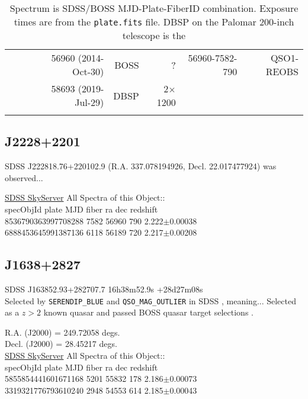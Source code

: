 \documentclass[a4paper,fleqn,usenatbib]{mnras}
\begin{document}
\begin{table*}
\begin{tabular}{r  r  r r    r r r r}
                                         &              &              & 56960   (2014-Oct-30)    & BOSS             & ?                         & 56960-7582-790     & QSO1-REOBS \\ 
                                         &               &             & 58693 (2019-Jul-29)      & DBSP              & 2$\times$1200  &       &    \\
                                       &                &               &                                         &                   &                             &  & \\
   \hline \hline   
  \end{tabular}
  \caption{Spectrum is SDSS/BOSS MJD-Plate-FiberID combination. 
Exposure times are from the {\tt plate.fits} file. 
DBSP on the Palomar 200-inch telescope is the } 
 \label{tab:obs_notes}
\end{table*}





\subsection{J2228+2201}
SDSS J222818.76+220102.9 (R.A. 337.078194926, Decl. 22.017477924) was observed... 

\href{skyserver.sdss.org/dr15/en/tools/explore/summary.aspx?id=1237678579819479655}{SDSS SkyServer}
All Spectra of this Object:: \\
specObjId	plate	MJD	fiber	ra	dec	redshift \\
8536790363997708288	7582	56960	790	2.222$\pm$0.00038\\
6888453645991387136	6118	56189	720	2.217$\pm$0.00208\\



\subsection{J1638+2827}
SDSS J163852.93+282707.7       16h38m52.9s +28d27m08s  \\
Selected by {\tt SERENDIP\_BLUE} and {\tt QSO\_MAG\_OUTLIER} in SDSS \citep{Richards2002}, meaning...
Selected as a $z>2$ known quasar and passed BOSS quasar target selections \citep{Ross2012}. 


R.A. (J2000) = 249.72058 degs. \\
Decl. (J2000) = 28.45217 degs. \\
\href{skyserver.sdss.org/dr15/en/tools/explore/Summary.aspx?id=1237662301375824232}{SDSS SkyServer} 
All Spectra of this Object:: \\
specObjId	plate	MJD	fiber	ra	dec	redshift \\
5855854441601671168	5201	55832	178	2.186$\pm$0.00073\\
3319321776793610240	2948	54553	614	2.185$\pm$0.00043\\
\end{document}
